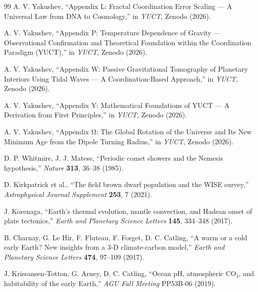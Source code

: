 \documentclass[11pt,a4paper]{article}
\begin{document}
\begin{thebibliography}{99}
		A. V. Yakushev, ``Appendix L: Fractal Coordination Error Scaling — A Universal Law from DNA to Cosmology,''
		in \emph{YUCT}, Zenodo (2026).
		
		A. V. Yakushev, ``Appendix P: Temperature Dependence of Gravity — Observational Confirmation and Theoretical Foundation within the Coordination Paradigm (YUCT),''
		in \emph{YUCT}, Zenodo (2026).
		
		A. V. Yakushev, ``Appendix W: Passive Gravitational Tomography of Planetary Interiors Using Tidal Waves — A Coordination-Based Approach,''
		in \emph{YUCT}, Zenodo (2026).
		
		A. V. Yakushev, ``Appendix Y: Mathematical Foundations of YUCT — A Derivation from First Principles,''
		in \emph{YUCT}, Zenodo (2026).
		
		A. V. Yakushev, ``Appendix Ω: The Global Rotation of the Universe and Its New Minimum Age from the Dipole Turning Radius,''
		in \emph{YUCT}, Zenodo (2026).
		
		
		D. P. Whitmire, J. J. Matese, ``Periodic comet showers and the Nemesis hypothesis,''
		\emph{Nature} \textbf{313}, 36–38 (1985).
		
		D. Kirkpatrick et al., ``The field brown dwarf population and the WISE survey,''
		\emph{Astrophysical Journal Supplement} \textbf{253}, 7 (2021).
		
		J. Korenaga, ``Earth's thermal evolution, mantle convection, and Hadean onset of plate tectonics,''
		\emph{Earth and Planetary Science Letters} \textbf{145}, 334–348 (2017).
		
		B. Charnay, G. Le Hir, F. Fluteau, F. Forget, D. C. Catling, ``A warm or a cold early Earth? New insights from a 3‑D climate‑carbon model,''
		\emph{Earth and Planetary Science Letters} \textbf{474}, 97–109 (2017).
		
		J. Krissansen‑Totton, G. Arney, D. C. Catling, ``Ocean pH, atmospheric CO₂, and habitability of the early Earth,''
		\emph{AGU Fall Meeting} PP53B‑06 (2019).
		

\end{thebibliography}
\end{document}
